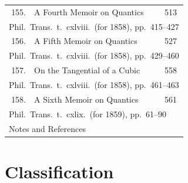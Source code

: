 \documentclass[11pt,a4paper]{article}
\theoremstyle{plain}
\begin{document}
\begin{longtable}{rp{8cm}l}
155. & A Fourth Memoir on Quantics & 513\\
\multicolumn{3}{l}{\small Phil.\ Trans.\ t.\ cxlviii.\ (for 1858), pp.\ 415--427}\\[0.5em]
156. & A Fifth Memoir on Quantics & 527\\
\multicolumn{3}{l}{\small Phil.\ Trans.\ t.\ cxlviii.\ (for 1858), pp.\ 429--460}\\[0.5em]
157. & On the Tangential of a Cubic & 558\\
\multicolumn{3}{l}{\small Phil.\ Trans.\ t.\ cxlviii.\ (for 1858), pp.\ 461--463}\\[0.5em]
158. & A Sixth Memoir on Quantics & 561\\
\multicolumn{3}{l}{\small Phil.\ Trans.\ t.\ cxlix.\ (for 1859), pp.\ 61--90}\\[0.5em]
\multicolumn{3}{l}{Notes and References \dotfill 593}\\
\bottomrule
\end{longtable}
\clearpage

\section*{Classification}
\end{document}
